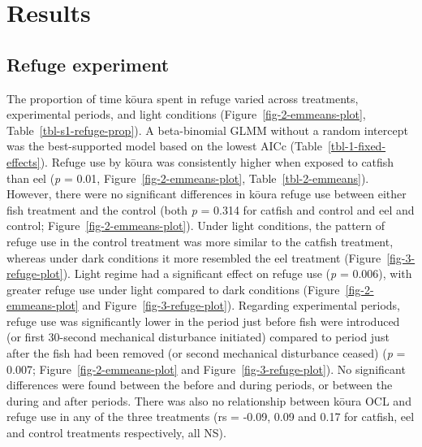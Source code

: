 \documentclass[
  letterpaper,
  DIV=11,
  numbers=noendperiod]{scrartcl}
\begin{document}
\section{Results}\label{results}

\subsection{Refuge experiment}\label{refuge-experiment-1}

The proportion of time kōura spent in refuge varied across treatments,
experimental periods, and light conditions
(Figure~\ref{fig-2-emmeans-plot}, Table~\ref{tbl-s1-refuge-prop}). A
beta-binomial GLMM without a random intercept was the best-supported
model based on the lowest AICc (Table~\ref{tbl-1-fixed-effects}). Refuge
use by kōura was consistently higher when exposed to catfish than eel
(\emph{p} = 0.01, Figure~\ref{fig-2-emmeans-plot},
Table~\ref{tbl-2-emmeans}). However, there were no significant
differences in kōura refuge use between either fish treatment and the
control (both \emph{p} = 0.314 for catfish and control and eel and
control; Figure~\ref{fig-2-emmeans-plot}). Under light conditions, the
pattern of refuge use in the control treatment was more similar to the
catfish treatment, whereas under dark conditions it more resembled the
eel treatment (Figure~\ref{fig-3-refuge-plot}). Light regime had a
significant effect on refuge use (\emph{p} = 0.006), with greater refuge
use under light compared to dark conditions
(Figure~\ref{fig-2-emmeans-plot} and Figure~\ref{fig-3-refuge-plot}).
Regarding experimental periods, refuge use was significantly lower in
the period just before fish were introduced (or first 30-second
mechanical disturbance initiated) compared to period just after the fish
had been removed (or second mechanical disturbance ceased) (\emph{p} =
0.007; Figure~\ref{fig-2-emmeans-plot} and
Figure~\ref{fig-3-refuge-plot}). No significant differences were found
between the before and during periods, or between the during and after
periods. There was also no relationship between kōura OCL and refuge use
in any of the three treatments (rs = -0.09, 0.09 and 0.17 for catfish,
eel and control treatments respectively, all NS).
\end{document}
